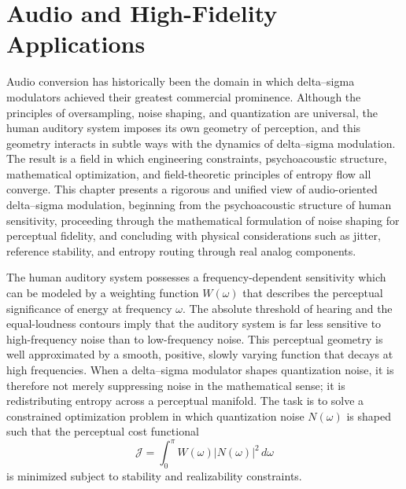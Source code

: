 
\chapter{Audio and High-Fidelity Applications}

Audio conversion has historically been the domain in which delta--sigma modulators achieved their greatest commercial prominence. Although the principles of oversampling, noise shaping, and quantization are universal, the human auditory system imposes its own geometry of perception, and this geometry interacts in subtle ways with the dynamics of delta--sigma modulation. The result is a field in which engineering constraints, psychoacoustic structure, mathematical optimization, and field-theoretic principles of entropy flow all converge. This chapter presents a rigorous and unified view of audio-oriented delta--sigma modulation, beginning from the psychoacoustic structure of human sensitivity, proceeding through the mathematical formulation of noise shaping for perceptual fidelity, and concluding with physical considerations such as jitter, reference stability, and entropy routing through real analog components.

The human auditory system possesses a frequency-dependent sensitivity which can be modeled by a weighting function \(W(\omega)\) that describes the perceptual significance of energy at frequency \(\omega\). The absolute threshold of hearing and the equal-loudness contours imply that the auditory system is far less sensitive to high-frequency noise than to low-frequency noise. This perceptual geometry is well approximated by a smooth, positive, slowly varying function that decays at high frequencies. When a delta--sigma modulator shapes quantization noise, it is therefore not merely suppressing noise in the mathematical sense; it is redistributing entropy across a perceptual manifold. The task is to solve a constrained optimization problem in which quantization noise \(N(\omega)\) is shaped such that the perceptual cost functional
\[
\mathcal{J} = \int_{0}^{\pi} W(\omega) |N(\omega)|^{2} \, d\omega
\]
is minimized subject to stability and realizability constraints.


